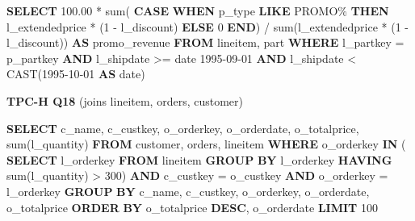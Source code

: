 \documentclass[
  10pt,
]{article}
\newenvironment{Shaded}{}{}
\newcommand{\ControlFlowTok}[1]{\textcolor[rgb]{0.00,0.44,0.13}{\textbf{#1}}}
\newcommand{\DataTypeTok}[1]{\textcolor[rgb]{0.56,0.13,0.00}{#1}}
\newcommand{\DecValTok}[1]{\textcolor[rgb]{0.25,0.63,0.44}{#1}}
\newcommand{\FloatTok}[1]{\textcolor[rgb]{0.25,0.63,0.44}{#1}}
\newcommand{\FunctionTok}[1]{\textcolor[rgb]{0.02,0.16,0.49}{#1}}
\newcommand{\KeywordTok}[1]{\textcolor[rgb]{0.00,0.44,0.13}{\textbf{#1}}}
\newcommand{\NormalTok}[1]{#1}
\newcommand{\OperatorTok}[1]{\textcolor[rgb]{0.40,0.40,0.40}{#1}}
\newcommand{\StringTok}[1]{\textcolor[rgb]{0.25,0.44,0.63}{#1}}
\begin{document}
\begin{Shaded}
\begin{Highlighting}[]
\KeywordTok{SELECT}
    \FloatTok{100.00} \OperatorTok{*} \FunctionTok{sum}\NormalTok{(}
        \ControlFlowTok{CASE} \ControlFlowTok{WHEN}\NormalTok{ p\_type }\KeywordTok{LIKE} \StringTok{\textquotesingle{}PROMO\%\textquotesingle{}} \ControlFlowTok{THEN}
\NormalTok{            l\_extendedprice }\OperatorTok{*}\NormalTok{ (}\DecValTok{1} \OperatorTok{{-}}\NormalTok{ l\_discount)}
        \ControlFlowTok{ELSE}
            \DecValTok{0}
        \ControlFlowTok{END}\NormalTok{) }\OperatorTok{/} \FunctionTok{sum}\NormalTok{(l\_extendedprice }\OperatorTok{*}\NormalTok{ (}\DecValTok{1} \OperatorTok{{-}}\NormalTok{ l\_discount)) }\KeywordTok{AS}\NormalTok{ promo\_revenue}
\KeywordTok{FROM}
\NormalTok{    lineitem,}
\NormalTok{    part}
\KeywordTok{WHERE}
\NormalTok{    l\_partkey }\OperatorTok{=}\NormalTok{ p\_partkey}
    \KeywordTok{AND}\NormalTok{ l\_shipdate }\OperatorTok{\textgreater{}=} \DataTypeTok{date} \StringTok{\textquotesingle{}1995{-}09{-}01\textquotesingle{}}
    \KeywordTok{AND}\NormalTok{ l\_shipdate }\OperatorTok{\textless{}} \FunctionTok{CAST}\NormalTok{(}\StringTok{\textquotesingle{}1995{-}10{-}01\textquotesingle{}} \KeywordTok{AS} \DataTypeTok{date}\NormalTok{)}
\end{Highlighting}
\end{Shaded}

\textbf{TPC-H Q18} (joins lineitem, orders, customer)

\begin{Shaded}
\begin{Highlighting}[]
\KeywordTok{SELECT}
\NormalTok{    c\_name,}
\NormalTok{    c\_custkey,}
\NormalTok{    o\_orderkey,}
\NormalTok{    o\_orderdate,}
\NormalTok{    o\_totalprice,}
    \FunctionTok{sum}\NormalTok{(l\_quantity)}
\KeywordTok{FROM}
\NormalTok{    customer,}
\NormalTok{    orders,}
\NormalTok{    lineitem}
\KeywordTok{WHERE}
\NormalTok{    o\_orderkey }\KeywordTok{IN}\NormalTok{ (}
        \KeywordTok{SELECT}
\NormalTok{            l\_orderkey}
        \KeywordTok{FROM}
\NormalTok{            lineitem}
        \KeywordTok{GROUP} \KeywordTok{BY}
\NormalTok{            l\_orderkey}
        \KeywordTok{HAVING}
            \FunctionTok{sum}\NormalTok{(l\_quantity) }\OperatorTok{\textgreater{}} \DecValTok{300}\NormalTok{)}
    \KeywordTok{AND}\NormalTok{ c\_custkey }\OperatorTok{=}\NormalTok{ o\_custkey}
    \KeywordTok{AND}\NormalTok{ o\_orderkey }\OperatorTok{=}\NormalTok{ l\_orderkey}
\KeywordTok{GROUP} \KeywordTok{BY}
\NormalTok{    c\_name,}
\NormalTok{    c\_custkey,}
\NormalTok{    o\_orderkey,}
\NormalTok{    o\_orderdate,}
\NormalTok{    o\_totalprice}
\KeywordTok{ORDER} \KeywordTok{BY}
\NormalTok{    o\_totalprice }\KeywordTok{DESC}\NormalTok{,}
\NormalTok{    o\_orderdate}
\KeywordTok{LIMIT} \DecValTok{100}
\end{Highlighting}
\end{Shaded}
\end{document}
